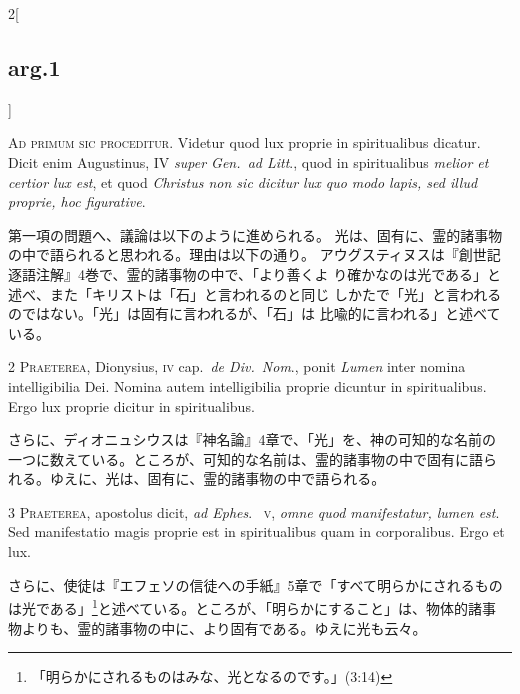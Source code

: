 \documentclass[paper=a4paper,fontsize=10pt,jafontsize=9pt,titlepage]{jlreq}
\begin{document}
\begin{paracol}{2}[\subsection{arg.1}]

{\huge A}{\scshape d primum sic proceditur}. Videtur quod lux proprie in
spiritualibus dicatur. Dicit enim Augustinus, IV {\itshape super Gen.~ad
Litt}., quod in spiritualibus {\itshape melior et certior lux est}, et
quod {\itshape Christus non sic dicitur lux quo modo lapis, sed illud
proprie, hoc figurative}.

\switchcolumn

第一項の問題へ、議論は以下のように進められる。
光は、固有に、霊的諸事物の中で語られると思われる。理由は以下の通り。
アウグスティヌスは『創世記逐語注解』4巻で、霊的諸事物の中で、「より善くよ
 り確かなのは光である」と述べ、また「キリストは「石」と言われるのと同じ
 しかたで「光」と言われるのではない。「光」は固有に言われるが、「石」は
 比喩的に言われる」と述べている。


{\scshape 2 Praeterea}, Dionysius, {\scshape iv} cap.~{\itshape de
Div.~Nom}., ponit {\itshape Lumen} inter nomina intelligibilia
Dei. Nomina autem intelligibilia proprie dicuntur in spiritualibus. Ergo
lux proprie dicitur in spiritualibus.

\switchcolumn

さらに、ディオニュシウスは『神名論』4章で、「光」を、神の可知的な名前の
 一つに数えている。ところが、可知的な名前は、霊的諸事物の中で固有に語ら
 れる。ゆえに、光は、固有に、霊的諸事物の中で語られる。


{\scshape 3 Praeterea}, apostolus dicit, {\itshape ad Ephes}.~{\scshape
v}, {\itshape omne quod manifestatur, lumen est}. Sed manifestatio magis
proprie est in spiritualibus quam in corporalibus. Ergo et lux.

\switchcolumn

さらに、使徒は『エフェソの信徒への手紙』5章で「すべて明らかにされるもの
 は光である」\footnote{「明らかにされるものはみな、光となるのです。」(3:14)}と述べている。ところが、「明らかにすること」は、物体的諸事
 物よりも、霊的諸事物の中に、より固有である。ゆえに光も云々。


\end{paracol}
\end{document}
